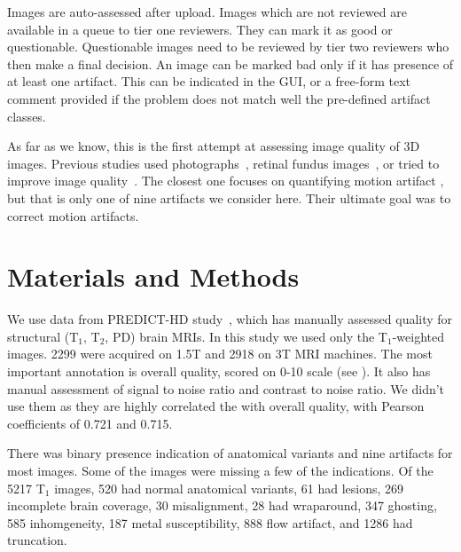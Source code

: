 \documentclass{midl} %
\begin{document}
Images are auto-assessed after upload.
Images which are not reviewed are available in a queue to tier one reviewers. They can mark it as good or questionable. Questionable images need to be reviewed by tier two reviewers who then make a final decision. An image can be marked bad only if it has presence of at least one artifact. This can be indicated in the GUI, or a free-form text comment provided if the problem does not match well the pre-defined artifact classes.


As far as we know, this is the first attempt at assessing image quality of 3D images. Previous studies used photographs~\cite{bosse2017deep,hosu2020koniq}, retinal fundus images~\cite{yu2017image},
or tried to improve image quality~\cite{higaki2019improvement}. The closest one focuses on quantifying motion artifact \cite{butskova2021adversarial}, but that is only one of nine artifacts we consider here. Their ultimate goal was to correct motion artifacts.

\section{Materials and Methods}

We use data from PREDICT-HD study~\cite{paulsen2014clinical}, which has manually assessed quality for structural (T$_1$, T$_2$, PD) brain MRIs. In this study we used only the T$_1$-weighted images. 2299 were acquired on 1.5T and 2918 on 3T MRI machines. The most important annotation is overall quality, scored on 0-10 scale (see ). It also has manual assessment of signal to noise ratio and contrast to noise ratio. We didn't use them as they are highly correlated the with overall quality, with Pearson coefficients of 0.721 and 0.715.

There was binary presence indication of anatomical variants and nine artifacts for most images. Some of the images were missing a few of the indications. Of the 5217 T$_1$ images, 520 had normal anatomical variants, 61 had lesions, 269 incomplete brain coverage, 30 misalignment, 28 had wraparound, 347 ghosting, 585 inhomgeneity, 187 metal susceptibility, 888 flow artifact, and 1286 had truncation.
\end{document}
